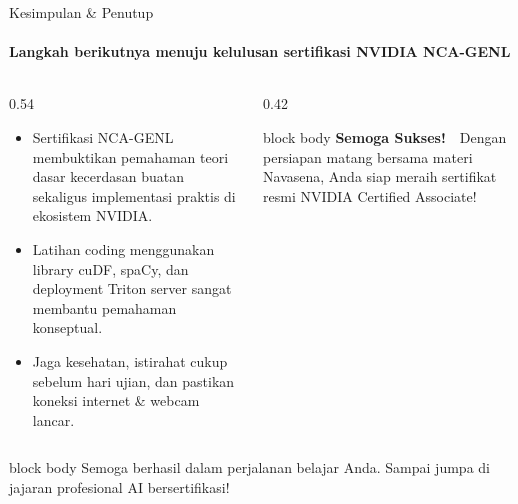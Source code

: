 \documentclass[aspectratio=169,t]{beamer}
\newcommand{\takeaway}[1]{%
  \vspace{0.1em}
  \begin{beamercolorbox}[rounded=true,shadow=false,sep=5pt]{block body}
    \centering\footnotesize\color{nvlightgreen}#1
  \end{beamercolorbox}%
}
\begin{document}
\begin{frame}{Kesimpulan \& Penutup}
  \framesubtitle{Langkah berikutnya menuju kelulusan sertifikasi NVIDIA NCA-GENL}
  \begin{columns}[T]
    \begin{column}{0.54\textwidth}
      \begin{itemize}\small
        \item Sertifikasi NCA-GENL membuktikan pemahaman teori dasar kecerdasan buatan sekaligus implementasi praktis di ekosistem NVIDIA.
        \item Latihan coding menggunakan library cuDF, spaCy, dan deployment Triton server sangat membantu pemahaman konseptual.
        \item Jaga kesehatan, istirahat cukup sebelum hari ujian, dan pastikan koneksi internet \& webcam lancar.
      \end{itemize}
    \end{column}
    \begin{column}{0.42\textwidth}
      \begin{center}
      \begin{beamercolorbox}[rounded=true,shadow=false,sep=8pt]{block body}
        {\color{nvgreen}\Large\bfseries Semoga Sukses! 🚀}
        \vspace{0.5em}
        {\scriptsize\color{nvwhite}
        Dengan persiapan matang bersama materi Navasena, Anda siap meraih sertifikat resmi NVIDIA Certified Associate!}
      \end{beamercolorbox}
      \end{center}
    \end{column}
  \end{columns}
  \takeaway{Semoga berhasil dalam perjalanan belajar Anda. Sampai jumpa di jajaran profesional AI bersertifikasi!}
\end{frame}
\end{document}
